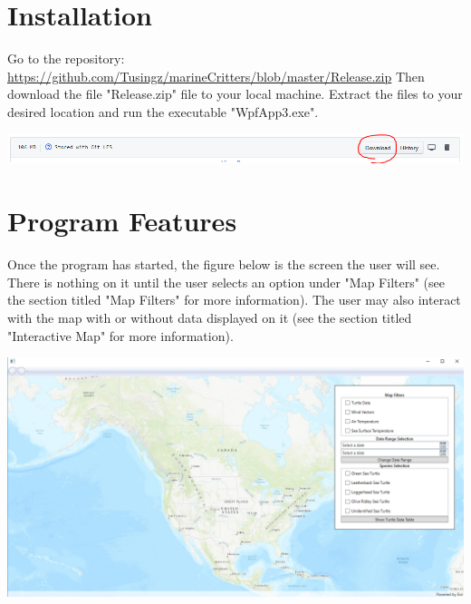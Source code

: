 \documentclass[onecolumn, draftclsnofoot,10pt, compsoc]{IEEEtran}
\begin{document}
\begin{titlepage}
\begin{singlespace}
    \end{singlespace}
\end{titlepage}
\newpage
{}
\tableofcontents
\listoffigures
\clearpage

\section{Installation}
Go to the repository: 
\newline \url{https://github.com/Tusingz/marineCritters/blob/master/Release.zip}
\newline Then download the file "Release.zip" file to your local machine. Extract the files to your desired location and run the executable "WpfApp3.exe".
\newline \begin{center}\includegraphics[width = \textwidth]{images/download-zip.PNG}\end{center}

\section{Program Features}
Once the program has started, the figure below is the screen the user will see. There is nothing on it until the user selects an option under "Map Filters" (see the section titled "Map Filters" for more information). 
\newline The user may also interact with the map with or without data displayed on it (see the section titled "Interactive Map" for more information). 
\newline \begin{center}\includegraphics[width=0.5 \textwidth]{images/startup-program.PNG}\end{center}
\end{document}
